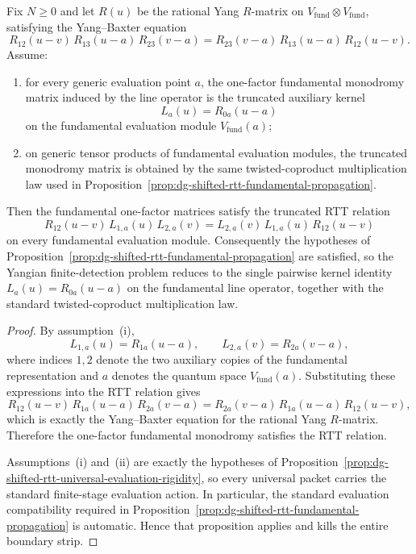\begin{proposition}
\label{prop:dg-shifted-rtt-auxiliary-kernel-criterion}
Fix $N \ge 0$ and let $R(u)$ be the rational Yang $R$-matrix on
$V_{\mathrm{fund}}\otimes V_{\mathrm{fund}}$, satisfying the
Yang--Baxter equation
\[
R_{12}(u-v)\,R_{13}(u-a)\,R_{23}(v-a)
=
R_{23}(v-a)\,R_{13}(u-a)\,R_{12}(u-v).
\]
Assume:
\begin{enumerate}[label=\textup{(\roman*)}]
\item for every generic evaluation point $a$, the one-factor
 fundamental monodromy matrix induced by the line operator is the
 truncated auxiliary kernel
 \[
 L_a(u)=R_{0a}(u-a)
 \]
 on the fundamental evaluation module
 $V_{\mathrm{fund}}(a)$;
\item on generic tensor products of fundamental evaluation modules, the
 truncated monodromy matrix is obtained by the same twisted-coproduct
 multiplication law used in
 Proposition~\ref{prop:dg-shifted-rtt-fundamental-propagation}.
\end{enumerate}
Then the fundamental one-factor matrices satisfy the truncated RTT
relation
\[
R_{12}(u-v)\,L_{1,a}(u)\,L_{2,a}(v)
=
L_{2,a}(v)\,L_{1,a}(u)\,R_{12}(u-v)
\]
on every fundamental evaluation module. Consequently the hypotheses of
Proposition~\ref{prop:dg-shifted-rtt-fundamental-propagation} are
satisfied, so the Yangian finite-detection problem reduces to the
single pairwise kernel identity
$L_a(u)=R_{0a}(u-a)$ on the fundamental line operator, together with
the standard twisted-coproduct multiplication law.
\end{proposition}

\begin{proof}
By assumption~\textup{(i)},
\[
L_{1,a}(u)=R_{1a}(u-a),
\qquad
L_{2,a}(v)=R_{2a}(v-a),
\]
where indices $1,2$ denote the two auxiliary copies of the fundamental
representation and $a$ denotes the quantum space
$V_{\mathrm{fund}}(a)$. Substituting these expressions into the RTT
relation gives
\[
R_{12}(u-v)\,R_{1a}(u-a)\,R_{2a}(v-a)
=
R_{2a}(v-a)\,R_{1a}(u-a)\,R_{12}(u-v),
\]
which is exactly the Yang--Baxter equation for the rational Yang
$R$-matrix. Therefore the one-factor fundamental monodromy satisfies
the RTT relation.

Assumptions~\textup{(i)} and~\textup{(ii)} are exactly the hypotheses of
Proposition~\ref{prop:dg-shifted-rtt-universal-evaluation-rigidity}, so
every universal packet carries the standard finite-stage evaluation
action. In particular, the standard evaluation compatibility required
in Proposition~\ref{prop:dg-shifted-rtt-fundamental-propagation} is
automatic. Hence that proposition applies and kills the entire
boundary strip.
\end{proof}

